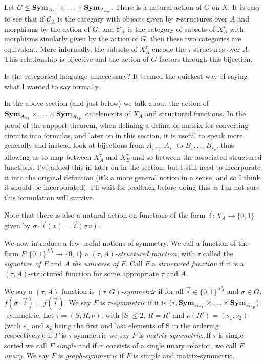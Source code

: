 \documentclass[../paper.tex]{subfiles}
\begin{document}
Let $G \leq \text{\textbf{Sym}}_{A_{s_1}} \times \ldots \times \text{\textbf{Sym}}_{A_{s_p}}$. There is a
natural action of $G$ on $X$. It is easy to see that if $\mathcal{C}_A$ is the
category with objects given by $\tau$-structures over $A$ and morphisms by the
action of $G$, and $\mathcal{C}_X$ is the category of subsets of $X^{\tau}_A$
with morphisms similarly given by the action of $G$, then these two categories
are equivalent. More informally, the subsets of $X^{\tau}_A$ encode the
$\tau$-structures over $A$. This relationship is bijective and the action of $G$
factors through this bijection.

\begin{remark}
  Is the categorical language unnecessary? It seemed the quickest way of saying
  what I wanted to say formally.
\end{remark}

\begin{remark}
  In the above section (and just below) we talk about the action of
  $\text{\textbf{Sym}}_{A_{s_1}} \times \ldots \times \text{\textbf{Sym}}_{A_{s_p}}$ on elements of $X^\tau_A$
  and structured functions. In the proof of the support theorem, when defining a
  definable matrix for converting circuits into formulas, and later on in this
  section, it is useful to speak more generally and instead look at bijections
  from $A_1, \ldots A_{s_p}$ to $B_1, \ldots, B_{s_p}$, thus allowing us to map
  between $X^\tau_A$ and $X^\tau_B$ and so between the associated structured
  functions. I've added this in later on in the section, but I still need to
  incorporate it into the original definition (it's a more general notion in a
  sense, and so I think it should be incorporated). I'll wait for feedback
  before doing this as I'm not sure this formulation will survive.
\end{remark}

Note that there is also a natural action on functions of the form $\vec{i}:
X^{\tau}_A \rightarrow \{0,1\}$ given by $\sigma \cdot \vec{i}(x) =
\vec{i}(\sigma x)$.

We now introduce a few useful notions of symmetry. We call a function of the
form $F:\{0,1\}^{X^{\tau}_A} \rightarrow \{0,1\}$ a \emph{$(\tau, A)$-structured
  function}, with $\tau$ called the \emph{signature of $F$} and $A$ \emph{the
  universe of $F$}. Call $F$ a \emph{structured function} if it is a $(\tau,
A)$-structured function for some appropriate $\tau$ and $A$.

We say a $(\tau, A)$-function is \emph{$(\tau, G)$-symmetric} if for all
$\vec{i} \in \{0,1\}^{X^\tau_A}$ and $\sigma \in G$, $f(\sigma \cdot \vec{i}) =
f(\vec{i})$. We say $F$ is \emph{$\tau$-symmetric} if it is $(\tau,
\text{\textbf{Sym}}_{A_{s_1}} \times \ldots \times \text{\textbf{Sym}}_{A_{s_p}})$-symmetric. Let $\tau = (S,
R, \nu)$, with $\vert S \vert \leq 2$, $R = {R'}$ and $\nu (R') = (s_1, s_2)$
(with $s_1$ and $s_2$ being the first and last elements of S in the ordering
respectively); if $F$ is $\tau$-symmetric we say $F$ is \emph{matrix-symmetric}.
If $\tau$ is single-sorted we call $F$ \emph{simple} and if it consists of a
single unary relation, we call $F$ \emph{unary}. We say $F$ is
\emph{graph-symmetric} if $F$ is simple and matrix-symmetric.
\end{document}
